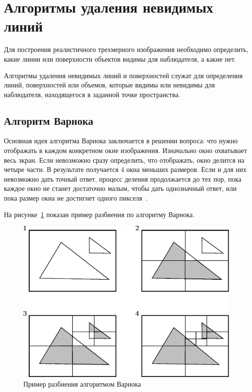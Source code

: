 \section{Алгоритмы удаления невидимых линий}
Для построения реалистичного трехмерного изображения необходимо определить, какие линии или поверхности объектов видимы для наблюдателя, а какие нет.

Алгоритмы удаления невидимых линий и поверхностей служат для определения линий, поверхностей или объемов, которые видимы или невидимы для наблюдателя, находящегося в заданной точке пространства.

\subsection{Алгоритм Варнока}
Основная идея алгоритма Варнока заключается в решении вопроса: что нужно отображать в каждом конкретном окне изображения. Изначально окно охватывает весь экран. Если невозможно сразу определить, что отображать, окно делится на четыре части. В результате получается 4 окна меньших размеров. Если и для них невозможно дать точный ответ, процесс деления продолжается до тех пор, пока каждое окно не станет достаточно малым, чтобы дать однозначный ответ, или пока размер окна не достигнет одного пикселя~\cite{Varnok_alg}.

На рисунке~\ref{fig:varnok_ex} показан пример разбиения по алгоритму Варнока.
\begin{figure}[H]
	\centering
	\includegraphics[scale=0.6]{img/Varnok_alg.eps}
	\caption{Пример разбиения алгоритмом Варнока}
	\label{fig:varnok_ex}
\end{figure}

